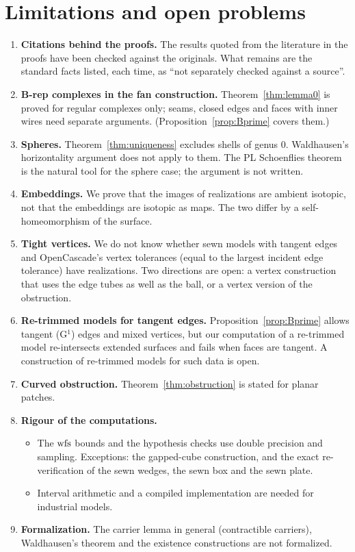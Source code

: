 \section{Limitations and open problems}\label{sec:open}

\begin{enumerate}
\item \textbf{Citations behind the proofs.} The results quoted from the literature in the proofs have been checked
against the originals. What remains are the standard facts listed, each time, as ``not separately checked against a
source''.
\item \textbf{B-rep complexes in the fan construction.} Theorem~\ref{thm:lemma0} is proved for regular complexes only;
seams, closed edges and faces with inner wires need separate arguments. (Proposition~\ref{prop:Bprime} covers them.)
\item \textbf{Spheres.} Theorem~\ref{thm:uniqueness} excludes shells of genus $0$. Waldhausen's horizontality
argument does not apply to them. The PL Schoenflies theorem~\cite[Thm.~17.12]{Moise77} is the natural tool for the sphere
case; the argument is not written.
\item \textbf{Embeddings.} We prove that the images of realizations are ambient isotopic, not that the embeddings
are isotopic as maps. The two differ by a self-homeomorphism of the surface.
\item \textbf{Tight vertices.} We do not know whether sewn models with tangent edges and OpenCascade's vertex
tolerances (equal to the largest incident edge tolerance) have realizations. Two directions are open: a vertex
construction that uses the edge tubes as well as the ball, or a vertex version of the obstruction.
\item \textbf{Re-trimmed models for tangent edges.} Proposition~\ref{prop:Bprime} allows tangent (G$^1$) edges and mixed
vertices, but our computation of a re-trimmed model re-intersects extended surfaces and fails when faces are tangent. A
construction of re-trimmed models for such data is open.
\item \textbf{Curved obstruction.} Theorem~\ref{thm:obstruction} is stated for planar patches.
\item \textbf{Rigour of the computations.}
  \begin{itemize}
  \item The $\operatorname{wfs}$ bounds and the hypothesis checks use double precision and sampling. Exceptions: the gapped-cube
  construction, and the exact re-verification of the sewn wedges, the sewn box and the sewn plate.
  \item Interval arithmetic and a compiled implementation are needed for industrial models.
  \end{itemize}
\item \textbf{Formalization.} The carrier lemma in general (contractible carriers), Waldhausen's theorem and the
existence constructions are not formalized.
\end{enumerate}


